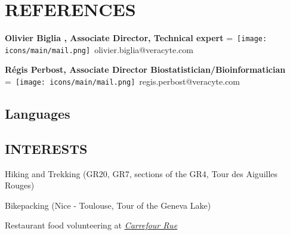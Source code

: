 \documentclass[]{plushcv}
\begin{document}
\begin{minipage}[t]{0.70\textwidth}
\sectionsep
\sectionsep



\section{REFERENCES} 
\textbf{Olivier Biglia , Associate Director, Technical expert}
\begingroup
{}=\hbox{
\texttt{[image: icons/main/mail.png]}\hspace{0.1cm} olivier.biglia@veracyte.com
}
\parbox{\wd0}{}\endgroup

\sectionsep
\textbf{Régis Perbost, Associate Director Biostatistician/Bioinformatician} 
\begingroup
{}=\hbox{
\texttt{[image: icons/main/mail.png]}\hspace{0.1cm} regis.perbost@veracyte.com
}
\parbox{\wd0}{}\endgroup
\sectionsep

\sectionsep

\end{minipage} 
\hfill
\begin{minipage}[t]{0.25\textwidth} 
\sectionsep
\sectionsep
\sectionsep
\sectionsep
\sectionsep
\sectionsep
\sectionsep
\sectionsep

\subsection{Languages}
\sectionsep
\runsubsection{}

\sectionsep
\runsubsection{}
\sectionsep
\sectionsep

\subsection{INTERESTS} 
\sectionsep
\sectionsep
\sectionsep
\begin{tightemize}
\item Hiking and Trekking (GR20, GR7, sections of the GR4, Tour des Aiguilles Rouges)
\item Bikepacking (Nice - Toulouse, Tour of the Geneva Lake) 
\item Restaurant food volunteering at \href{https://carrefour-rue.ch}{\underline{\textit{Carrefour Rue}}}
\end{tightemize}

\end{minipage}
\end{document}
